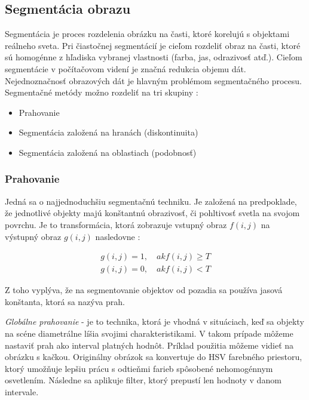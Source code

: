 \subsection{Segmentácia obrazu}
Segmentácia je proces rozdelenia obrázku na časti, ktoré korelujú s objektami reálneho sveta. Pri čiastočnej segmentácií je cieľom rozdeliť obraz na časti, ktoré sú homogénne z hľadiska vybranej vlastnosti (farba, jas, odrazivosť atď.). Cieľom segmentácie v počítačovom videní je značná redukcia objemu dát. Nejednoznačnosť obrazových dát je hlavným problémom segmentačného procesu. Segmentačné metódy možno rozdeliť na tri skupiny \cite{pocitacove_videnie_v_praxi}:


\begin{itemize}
\item Prahovanie
\item Segmentácia založená na hranách (diskontinuita)
\item Segmentácia založená na oblastiach (podobnosť)
\end{itemize}

\subsubsection{Prahovanie}
\label{sec:treasholding}
Jedná sa o najjednoduchšiu segmentačnú techniku. Je založená na predpoklade, že jednotlivé objekty majú konštantnú obrazivosť, či pohltivosť svetla na svojom povrchu. Je to transformácia, ktorá zobrazuje vstupný obraz $f(i, j)$ na výstupný obraz $g(i, j)$ nasledovne \cite{fit_trasholding}: 


\begin{equation}
    \begin{gathered}
        g (i{,}j)=1 {,}\quad {ak} f(i{,}j)\ge T\\ 
        g (i{,}j)=0 {,}\quad {ak} f(i{,}j)  < T
    \end{gathered}
\end{equation}


Z toho vyplýva, že na segmentovanie objektov od pozadia sa používa jasová konštanta, ktorá sa nazýva prah. \cite{pocitacove_videnie_v_praxi}


\textit{Globálne prahovanie} - je to technika, ktorá je vhodná v situáciach, keď sa objekty na scéne diametrálne líšia svojimi charakteristikami. V takom prípade môžeme nastaviť prah ako interval platných hodnôt. Príklad použitia môžeme vidieť na obrázku s kačkou. Originálny obrázok sa konvertuje do HSV farebného priestoru, ktorý umožňuje lepšiu prácu s odtieňmi farieb spôsobené nehomogénnym osvetlením. Následne sa aplikuje filter, ktorý prepustí len hodnoty v danom intervale. \cite{fit_trasholding}\cite{Learning_openCV}

